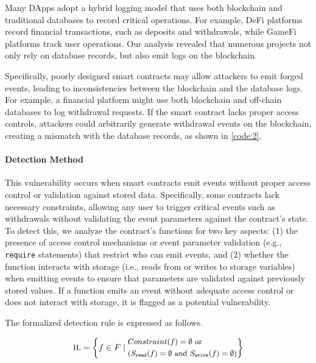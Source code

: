 Many DApps adopt a hybrid logging model that uses both blockchain and traditional databases to record critical operations. For example, DeFi platforms record financial transactions, such as deposits and withdrawals, while GameFi platforms track user operations. Our analysis revealed that numerous projects not only rely on database records, but also emit logs on the blockchain.

Specifically, poorly designed smart contracts may allow attackers to emit forged events, leading to inconsistencies between the blockchain and the database logs. For example, a financial platform might use both blockchain and off-chain databases to log withdrawal requests. If the smart contract lacks proper access controls, attackers could arbitrarily generate withdrawal events on the blockchain, creating a mismatch with the database records, as shown in \cref{code:2}.


\paragraph{Detection Method}
This vulnerability occurs when smart contracts emit events without proper access control or validation against stored data. Specifically, some contracts lack necessary constraints, allowing any user to trigger critical events such as withdrawals without validating the event parameters against the contract's state. To detect this, we analyze the contract's functions for two key aspects: (1) the presence of access control mechanisms or event parameter validation (e.g., \texttt{require} statements) that restrict who can emit events, and (2) whether the function interacts with storage (i.e., reads from or writes to storage variables) when emitting events to ensure that parameters are validated against previously stored values. If a function emits an event without adequate access control or does not interact with storage, it is flagged as a potential vulnerability.

The formalized detection rule is expressed as follows.

\begin{equation}
\small
\text{IL} = \left\{
f \in F \mid
\begin{aligned}
  & Constraint(f) = \emptyset \text{ or } \\
  & (S_{\texttt{read}}(f) = \emptyset \text{ and } S_{\texttt{write}}(f) = \emptyset)
\end{aligned}
\right\}
\end{equation}



